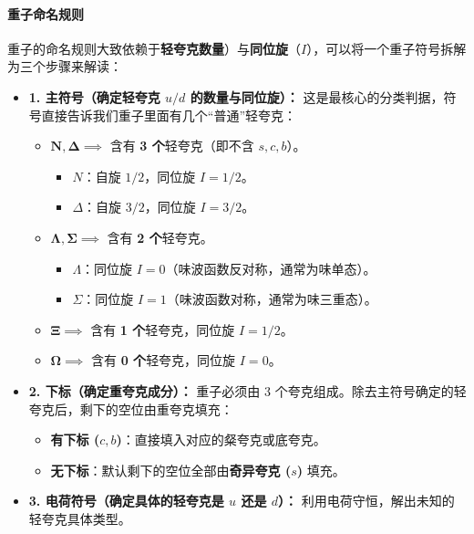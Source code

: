 \paragraph{重子命名规则}
重子的命名规则大致依赖于\textbf{轻夸克数量}）与\textbf{同位旋}（$I$），可以将一个重子符号拆解为三个步骤来解读：

\begin{itemize}
    \item \textbf{1. 主符号（确定轻夸克 $u/d$ 的数量与同位旋）：}
    这是最核心的分类判据，符号直接告诉我们重子里面有几个“普通”轻夸克：
    \begin{itemize}
        \item $\bm{N, \Delta} \implies$ 含有 \textbf{3 个}轻夸克（即不含 $s, c, b$）。
            \begin{itemize}
                \item $N$：自旋 $1/2$，同位旋 $I = 1/2$。
                \item $\Delta$：自旋 $3/2$，同位旋 $I = 3/2$。
            \end{itemize}
        \item $\bm{\Lambda, \Sigma} \implies$ 含有 \textbf{2 个}轻夸克。
            \begin{itemize}
                \item $\Lambda$：同位旋 $I = 0$（味波函数反对称，通常为味单态）。
                \item $\Sigma$：同位旋 $I = 1$（味波函数对称，通常为味三重态）。
            \end{itemize}
        \item $\bm{\Xi} \implies$ 含有 \textbf{1 个}轻夸克，同位旋 $I = 1/2$。
        \item $\bm{\Omega} \implies$ 含有 \textbf{0 个}轻夸克，同位旋 $I = 0$。
    \end{itemize}

    \item \textbf{2. 下标（确定重夸克成分）：}
    重子必须由 3 个夸克组成。除去主符号确定的轻夸克后，剩下的空位由重夸克填充：
    \begin{itemize}
        \item \textbf{有下标 ($c, b$)}：直接填入对应的粲夸克或底夸克。
        \item \textbf{无下标}：默认剩下的空位全部由\textbf{奇异夸克 ($s$)} 填充。
    \end{itemize}

    \item \textbf{3. 电荷符号（确定具体的轻夸克是 $u$ 还是 $d$）：}
    利用电荷守恒，解出未知的轻夸克具体类型。
\end{itemize}

